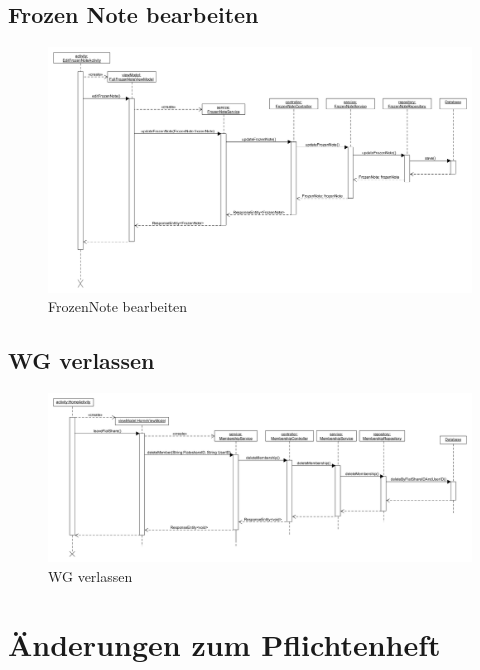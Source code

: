 \documentclass[a4paper]{scrreprt}
\begin{document}
	      
	      	
		
	      
		\section{Frozen Note bearbeiten}
 	\begin{figure}[H]
	       \centering
	       \includegraphics[scale = .35]{Sequenzdiagram_EditFrozenNote.png}
	       \caption{FrozenNote bearbeiten}
	      \end{figure}	
	      
	      	
		
		\section{WG verlassen}
		 \begin{figure}[H]
	       \centering
	       \includegraphics[scale = .35]{SD_WG_verlassen.png}
	       \caption{WG verlassen}
	      \end{figure}
	      	
		


\chapter{Änderungen zum Pflichtenheft}
	
\end{document}
